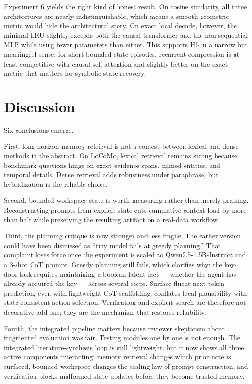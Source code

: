 \documentclass[11pt]{article}
\begin{document}
Experiment 6 yields the right kind of honest result. On cosine similarity, all three architectures are nearly indistinguishable, which means a smooth geometric metric would hide the architectural story. On exact local decode, however, the minimal LRU slightly exceeds both the causal transformer and the non-sequential MLP while using fewer parameters than either. This supports H6 in a narrow but meaningful sense: for short bounded-state episodes, recurrent compression is at least competitive with causal self-attention and slightly better on the exact metric that matters for symbolic state recovery.

\section{Discussion}
Six conclusions emerge.

First, long-horizon memory retrieval is not a contest between lexical and dense methods in the abstract. On LoCoMo, lexical retrieval remains strong because benchmark questions hinge on exact evidence spans, named entities, and temporal details. Dense retrieval adds robustness under paraphrase, but hybridization is the reliable choice.

Second, bounded workspace state is worth measuring rather than merely praising. Reconstructing prompts from explicit state cuts cumulative context load by more than half while preserving the resulting artifact on a real-data workflow.

Third, the planning critique is now stronger and less fragile. The earlier version could have been dismissed as ``tiny model fails at greedy planning.'' That complaint loses force once the experiment is scaled to Qwen2.5-1.5B-Instruct and a 3-shot CoT prompt. Greedy planning still fails, which clarifies why: the key-door task requires maintaining a boolean latent fact --- whether the agent has already acquired the key --- across several steps. Surface-fluent next-token prediction, even with lightweight CoT scaffolding, conflates local plausibility with state-consistent action selection. Verification and explicit search are therefore not decorative add-ons; they are the mechanism that restores reliability.

Fourth, the integrated pipeline matters because reviewer skepticism about fragmented evaluation was fair. Testing modules one by one is not enough. The integrated literature-synthesis loop is still lightweight, but it now shows all three active components interacting: memory retrieval changes which prior note is surfaced, bounded workspace changes the scaling law of prompt construction, and verification blocks malformed state updates before they become trusted memory.
\end{document}

